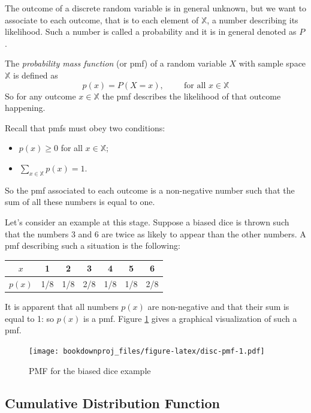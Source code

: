 \documentclass[
]{book}
\theoremstyle{definition}
\theoremstyle{definition}
\theoremstyle{definition}
\theoremstyle{definition}
\theoremstyle{remark}
\begin{document}
The outcome of a discrete random variable is in general unknown, but we want to associate to each outcome, that is to each element of \(\mathbb{X}\), a number describing its likelihood. Such a number is called a probability and it is in general denoted as \(P\).

The \emph{probability mass function} (or pmf) of a random variable \(X\) with sample space \(\mathbb{X}\) is defined as
\[
p(x)=P(X=x), \hspace{1cm} \mbox{for all } x\in\mathbb{X}
\]
So for any outcome \(x\in\mathbb{X}\) the pmf describes the likelihood of that outcome happening.

Recall that pmfs must obey two conditions:

\begin{itemize}
\item
  \(p(x)\geq 0\) for all \(x\in\mathbb{X}\);
\item
  \(\sum_{x\in\mathbb{X}}p(x)=1\).
\end{itemize}

So the pmf associated to each outcome is a non-negative number such that the sum of all these numbers is equal to one.

Let's consider an example at this stage. Suppose a biased dice is thrown such that the numbers 3 and 6 are twice as likely to appear than the other numbers. A pmf describing such a situation is the following:

\begin{longtable}[]{@{}ccccccc@{}}
\toprule
\(x\) & 1 & 2 & 3 & 4 & 5 & 6 \\
\midrule
\endhead
\(p(x)\) & 1/8 & 1/8 & 2/8 & 1/8 & 1/8 & 2/8 \\
\bottomrule
\end{longtable}

It is apparent that all numbers \(p(x)\) are non-negative and that their sum is equal to 1: so \(p(x)\) is a pmf. Figure \ref{fig:disc-pmf} gives a graphical visualization of such a pmf.

\begin{figure}
\centering
\texttt{[image: bookdownproj\_files/figure-latex/disc-pmf-1.pdf]}
\caption{\label{fig:disc-pmf}PMF for the biased dice example}
\end{figure}

\hypertarget{cumulative-distribution-function}{%
\subsection{Cumulative Distribution Function}\label{cumulative-distribution-function}}
\end{document}
